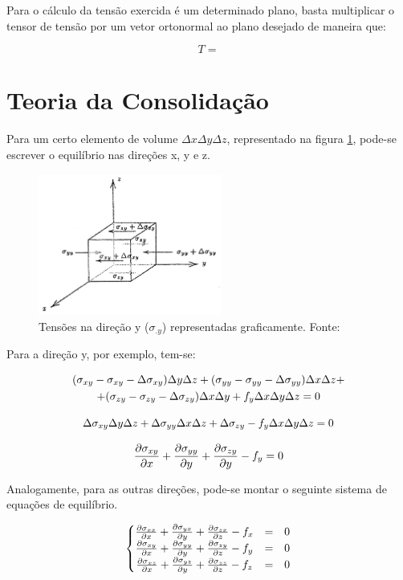 Para o cálculo da tensão exercida é um determinado plano, basta multiplicar o tensor de tensão por um vetor ortonormal ao plano desejado de maneira que:

\begin{equation}
T =
\end{equation}


\section{Teoria da Consolidação}

Para um certo elemento de volume $\Delta x\Delta y \Delta z$, representado na figura \ref{fig:equilibrio}, pode-se escrever o equilíbrio nas direções x, y e z.

\begin{figure}[!htbp]
\label{fig:equilibrio}
\centering
\includegraphics[width=6cm]{chap01/equilibrio.png}
\caption{Tensões na direção y ($\sigma_{.y}$) representadas graficamente.  Fonte: \cite{CompGeomec}}
\end{figure}

Para a direção y, por exemplo, tem-se:

\begin{multline}
   (\stxy - \stxy - \Delta \stxy) \Dy\Dz + (\styy - \styy - \Delta \styy)\Dx\Dz  +\\
   + (\stzy - \stzy - \Delta\stzy) \Dx\Dy + f_y\Dx\Dy\Dz = 0
\end{multline}

\begin{equation}
 \Delta \stxy \Dy\Dz + \Delta \styy\Dx\Dz + \Delta\stzy - f_y\Dx\Dy\Dz = 0
\end{equation}

\begin{equation}
\dx[\stxy] + \dy[\styy] + \dy[\stzy] - f_y = 0
\end{equation}

Analogamente, para as outras direções, pode-se montar o seguinte sistema de equações de equilíbrio.

\begin{equation}
\label{eq:equilibrio1}
\left\{\begin{matrix}
 \dx[\stxx] + \dy[\styx] + \dz[\stzx] - f_x & = & 0\\
 \dx[\stxy] + \dy[\styy] + \dz[\stzy] - f_y & = & 0\\
 \dx[\stxz] + \dy[\styz] + \dz[\stzz] - f_z & = & 0
\end{matrix}\right.
\end{equation}

